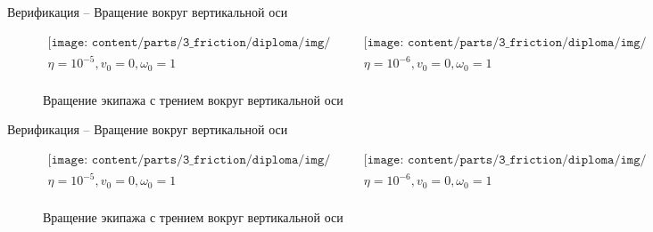 
\begin{frame}{Верификация -- Вращение вокруг вертикальной оси}
    \vspace{-50pt}
    \begin{figure}[h]
        \begin{center}\begin{equation*}\begin{array}{cc}
            \texttt{[image: content/parts/3\_friction/diploma/img/res/comparison\_v\_0\_0\_omega\_1\_frac\_1e-1\_n\_4\_time\_10s.png]} 
            &
            \texttt{[image: content/parts/3\_friction/diploma/img/res/comparison\_v\_0\_0\_omega\_1\_frac\_1e-2\_n\_4\_time\_10s.png]}\\
            \eta = 10^{-5}, v_0 = 0, \omega_0 = 1 & \eta = 10^{-6}, v_0 = 0, \omega_0 = 1\\
        \end{array}\end{equation*}\end{center}
        \caption{Вращение экипажа с трением вокруг вертикальной оси}
    \end{figure}
\end{frame}

\begin{frame}{Верификация -- Вращение вокруг вертикальной оси}
    \vspace{-50pt}
    \begin{figure}[h]
        \begin{center}\begin{equation*}\begin{array}{cc}
            \texttt{[image: content/parts/3\_friction/diploma/img/res/comparison\_v\_0\_0\_omega\_1\_frac\_1e-3\_n\_4\_time\_10s.png]} 
            &
            \texttt{[image: content/parts/3\_friction/diploma/img/res/comparison\_v\_0\_0\_omega\_1\_frac\_1e-4\_n\_4\_time\_10s.png]}\\
            \eta = 10^{-5}, v_0 = 0, \omega_0 = 1 & \eta = 10^{-6}, v_0 = 0, \omega_0 = 1\\
        \end{array}\end{equation*}\end{center}
        \caption{Вращение экипажа с трением вокруг вертикальной оси}
    \end{figure}
\end{frame}

